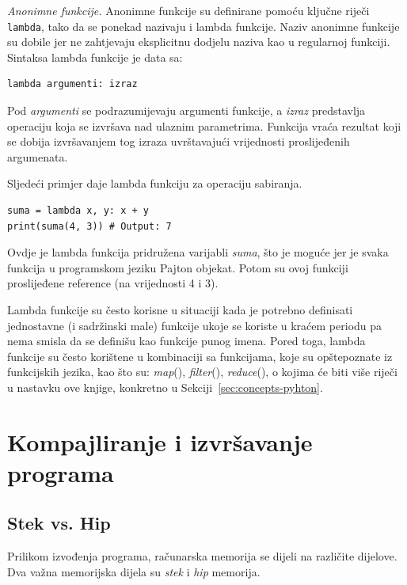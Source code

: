 \textit{Anonimne funkcije.}  Anonimne funkcije su definirane pomoću ključne riječi \texttt{lambda}, tako da se ponekad nazivaju i lambda funkcije.  Naziv anonimne funkcije su dobile jer ne zahtjevaju eksplicitnu dodjelu naziva kao u regularnoj funkciji. Sintaksa lambda funkcije je data sa:

\begin{verbatim}
lambda argumenti: izraz
\end{verbatim}
Pod \textit{argumenti} se podrazumijevaju argumenti funkcije, a \textit{izraz} predstavlja operaciju koja se izvršava nad ulaznim parametrima. Funkcija vraća rezultat koji se dobija izvršavanjem tog izraza uvrštavajući vrijednosti proslijeđenih argumenata. 

Sljedeći primjer daje lambda funkciju za operaciju sabiranja.
\begin{verbatim}
suma = lambda x, y: x + y
print(suma(4, 3)) # Output: 7
\end{verbatim}

Ovdje je lambda funkcija pridružena varijabli \textit{suma}, što je moguće jer je svaka funkcija u programskom jeziku Pajton objekat. Potom su ovoj funkciji proslijeđene reference (na vrijednosti 4 i 3). 

Lambda funkcije su često korisne u situaciji kada je potrebno definisati jednostavne (i sadržinski male) funkcije ukoje se koriste u kraćem periodu pa nema smisla da se definišu kao funkcije punog imena. Pored toga, lambda funkcije su često korištene u kombinaciji sa funkcijama, koje su opštepoznate iz funkcijskih jezika, kao što su: \textit{map}(), \textit{filter}(), \textit{reduce}(), o kojima će biti više riječi u nastavku ove knjige, konkretno u Sekciji~\ref{sec:concepts-pyhton}. 


\section{Kompajliranje i izvršavanje programa}

\subsection{Stek vs. Hip} 


Prilikom izvođenja programa, računarska memorija se dijeli na različite dijelove. Dva važna memorijska dijela su \textit{stek} i \textit{hip} memorija. 

